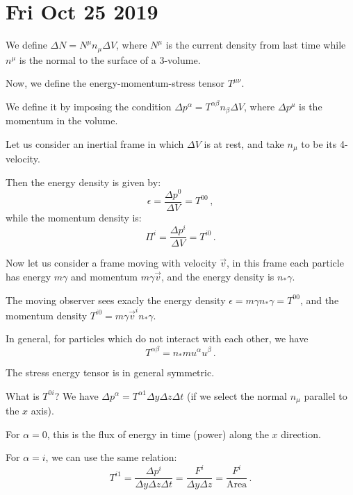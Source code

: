 \documentclass[main.tex]{subfiles}
\begin{document}
\section*{Fri Oct 25 2019}

We define \(\Delta N = N^{\mu }n_{\mu } \Delta V\), where \(N^{\mu }\) is the current density from last time while \(n^{\mu } \) is the normal to the surface of a 3-volume.

Now, we define the energy-momentum-stress tensor \(T^{\mu \nu }\).

We define it by imposing the condition \(\Delta p^{\alpha } = T^{\alpha \beta }n_{\beta }\Delta V\), where \(\Delta p^{\mu}\) is the momentum in the volume.

Let us consider an inertial frame in which \(\Delta V\) is at rest, and take \(n_{\mu }\) to be its 4-velocity.

Then the energy density is given by: 
%
\begin{equation}
  \epsilon  = \frac{\Delta p^{0}}{\Delta V} = T^{00}
\,,
\end{equation}
%
while the momentum density is: 
%
\begin{equation}
  \Pi^{i} = \frac{\Delta p^{i}}{\Delta V} = T^{i0}
\,.
\end{equation}

Now let us consider a frame moving with velocity \(\vec{v}  \), in this frame each particle has energy \(m \gamma \) and momentum \(m \gamma \vec{v}\), and the energy density is \(n_{*} \gamma \).

The moving observer sees exacly the energy density \(\epsilon = m \gamma n_{*} \gamma  = T^{00}\), and the momentum density \(T^{i0} = m \gamma \vec{v}^{i} n_{*}\gamma \).

In general, for particles which do not interact with each other, we have 
%
\begin{equation}
  T^{\alpha \beta } = n_{*} m u^{\alpha }u^{\beta }
\,.
\end{equation}

The stress energy tensor is in general symmetric.

What is \(T^{0i}\)? We have \(\Delta p^{\alpha } = T^{\alpha 1} \Delta y \Delta z \Delta t\) (if we select the normal \(n_{\mu }\) parallel to the \(x\) axis).

For \(\alpha = 0\), this is the flux of energy in time (power) along the \(x\) direction.

For \(\alpha = i\), we can use the same relation: 
%
\begin{equation}
  T^{i1} = \frac{\Delta p^{i}}{\Delta y \Delta z \Delta t}
  = \frac{F^{i}}{\Delta y \Delta z} = \frac{F^{i}}{\text{Area}}
\,.
\end{equation}
\end{document}
